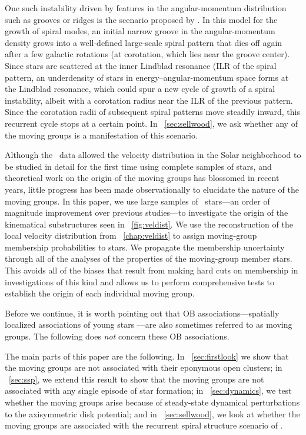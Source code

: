 One such instability driven by features in the angular-momentum
distribution such as grooves or ridges is the scenario proposed by
\citet{Sellwood91a} \citep[see also][]{Lovelace78a}. In this model for
the growth of spiral modes, an initial narrow groove in the
angular-momentum density grows into a well-defined large-scale spiral
pattern that dies off again after a few galactic rotations (at
corotation, which lies near the groove center). Since stars are
scattered at the inner Lindblad resonance (ILR of the spiral pattern,
an underdensity of stars in energy--angular-momentum space forms at
the Lindblad resonance, which could spur a new cycle of growth of a
spiral instability, albeit with a corotation radius near the ILR of
the previous pattern. Since the corotation radii of subsequent spiral
patterns move steadily inward, this recurrent cycle stops at a
certain point. In \sectionname~\ref{sec:sellwood}, we ask whether any
of the moving groups is a manifestation of this scenario.

Although the \Hipparcos\ data allowed the velocity distribution in the
Solar neighborhood to be studied in detail for the first time using
complete samples of stars, and theoretical work on the origin of the
moving groups has blossomed in recent years, little progress has been
made observationally to elucidate the nature of the moving groups. In
this paper, we use large samples of \Hipparcos\ stars---an order of
magnitude improvement over previous studies---to investigate the
origin of the kinematical substructures seen in
\figurename~\ref{fig:veldist}. We use the reconstruction of the local
velocity distribution from \chaptername~\ref{chap:veldist} to assign
moving-group membership probabilities to stars. We propagate the
membership uncertainty through all of the analyses of the properties
of the moving-group member stars. This avoids all of the biases that
result from making hard cuts on membership in investigations of this
kind and allows us to perform comprehensive tests to establish the
origin of each individual moving group.

Before we continue, it is worth pointing out that OB
associations---spatially localized associations of young stars
\citep[\eg,][]{deZeeuw99a}---are also sometimes referred to as moving
groups. The following does \emph{not} concern these OB associations.

The main parts of this paper are the following. In
\sectionname~\ref{sec:firstlook} we show that the moving groups are
not associated with their eponymous open clusters; in
\sectionname~\ref{sec:ssp}, we extend this result to show that the
moving groups are not associated with any single episode of star
formation; in \sectionname~\ref{sec:dynamics}, we test whether the
moving groups arise because of steady-state dynamical perturbations to
the axisymmetric disk potential; and in
\sectionname~\ref{sec:sellwood}, we look at whether the moving groups
are associated with the recurrent spiral structure scenario of
\citet{Sellwood91a}.


